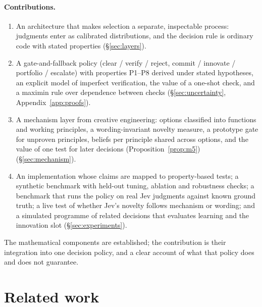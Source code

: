 \documentclass[11pt]{article}
\theoremstyle{definition}
\begin{document}
\paragraph{Contributions.}
\begin{enumerate}[leftmargin=1.6em,itemsep=1pt]
\item An architecture that makes selection a separate, inspectable process: judgments enter as
calibrated distributions, and the decision rule is ordinary code with stated properties
(\S\ref{sec:layers}).
\item A gate-and-fallback policy (clear / verify / reject, commit / innovate / portfolio /
escalate) with properties P1--P8 derived under stated hypotheses, an explicit model of imperfect
verification, the value of a one-shot check, and a maximin rule over dependence between checks
(\S\ref{sec:uncertainty}, Appendix~\ref{app:proofs}).
\item A mechanism layer from creative engineering: options classified into functions and working
principles, a wording-invariant novelty measure, a prototype gate for unproven principles, beliefs
per principle shared across options, and the value of one test for later decisions
(Proposition~\ref{prop:m5}) (\S\ref{sec:mechanism}).
\item An implementation whose claims are mapped to property-based tests; a synthetic benchmark with
held-out tuning, ablation and robustness checks; a benchmark that runs the policy on real Jev
judgments against known ground truth; a live test of whether Jev's novelty follows mechanism or
wording; and a simulated programme of related decisions that evaluates learning and the innovation
slot (\S\ref{sec:experiments}).
\end{enumerate}
The mathematical components are established; the contribution is their integration into one
decision policy, and a clear account of what that policy does and does not guarantee.

\section{Related work}
\end{document}
